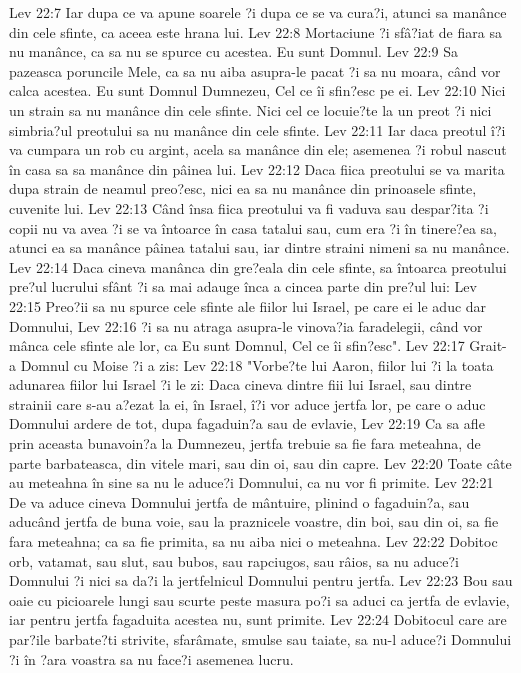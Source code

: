 Lev 22:7  Iar dupa ce va apune soarele ?i dupa ce se va cura?i, atunci sa manânce din cele sfinte, ca aceea este hrana lui.
Lev 22:8  Mortaciune ?i sfâ?iat de fiara sa nu manânce, ca sa nu se spurce cu acestea. Eu sunt Domnul.
Lev 22:9  Sa pazeasca poruncile Mele, ca sa nu aiba asupra-le pacat ?i sa nu moara, când vor calca acestea. Eu sunt Domnul Dumnezeu, Cel ce îi sfin?esc pe ei.
Lev 22:10  Nici un strain sa nu manânce din cele sfinte. Nici cel ce locuie?te la un preot ?i nici simbria?ul preotului sa nu manânce din cele sfinte.
Lev 22:11  Iar daca preotul î?i va cumpara un rob cu argint, acela sa manânce din ele; asemenea ?i robul nascut în casa sa sa manânce din pâinea lui.
Lev 22:12  Daca fiica preotului se va marita dupa strain de neamul preo?esc, nici ea sa nu manânce din prinoasele sfinte, cuvenite lui.
Lev 22:13  Când însa fiica preotului va fi vaduva sau despar?ita ?i copii nu va avea ?i se va întoarce în casa tatalui sau, cum era ?i în tinere?ea sa, atunci ea sa manânce pâinea tatalui sau, iar dintre straini nimeni sa nu manânce.
Lev 22:14  Daca cineva manânca din gre?eala din cele sfinte, sa întoarca preotului pre?ul lucrului sfânt ?i sa mai adauge înca a cincea parte din pre?ul lui:
Lev 22:15  Preo?ii sa nu spurce cele sfinte ale fiilor lui Israel, pe care ei le aduc dar Domnului,
Lev 22:16  ?i sa nu atraga asupra-le vinova?ia faradelegii, când vor mânca cele sfinte ale lor, ca Eu sunt Domnul, Cel ce îi sfin?esc".
Lev 22:17  Grait-a Domnul cu Moise ?i a zis:
Lev 22:18  "Vorbe?te lui Aaron, fiilor lui ?i la toata adunarea fiilor lui Israel ?i le zi: Daca cineva dintre fiii lui Israel, sau dintre strainii care s-au a?ezat la ei, în Israel, î?i vor aduce jertfa lor, pe care o aduc Domnului ardere de tot, dupa fagaduin?a sau de evlavie,
Lev 22:19  Ca sa afle prin aceasta bunavoin?a la Dumnezeu, jertfa trebuie sa fie fara meteahna, de parte barbateasca, din vitele mari, sau din oi, sau din capre.
Lev 22:20  Toate câte au meteahna în sine sa nu le aduce?i Domnului, ca nu vor fi primite.
Lev 22:21  De va aduce cineva Domnului jertfa de mântuire, plinind o fagaduin?a, sau aducând jertfa de buna voie, sau la praznicele voastre, din boi, sau din oi, sa fie fara meteahna; ca sa fie primita, sa nu aiba nici o meteahna.
Lev 22:22  Dobitoc orb, vatamat, sau slut, sau bubos, sau rapciugos, sau râios, sa nu aduce?i Domnului ?i nici sa da?i la jertfelnicul Domnului pentru jertfa.
Lev 22:23  Bou sau oaie cu picioarele lungi sau scurte peste masura po?i sa aduci ca jertfa de evlavie, iar pentru jertfa fagaduita acestea nu, sunt primite.
Lev 22:24  Dobitocul care are par?ile barbate?ti strivite, sfarâmate, smulse sau taiate, sa nu-l aduce?i Domnului ?i în ?ara voastra sa nu face?i asemenea lucru.
